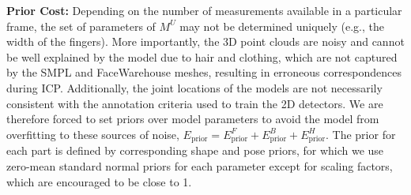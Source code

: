 \textbf{Prior Cost:} 
Depending on the number of measurements available in a particular frame, the set of parameters of $M^U$ may not be determined uniquely (e.g., the width of the fingers). More importantly, the 3D point clouds are noisy and cannot be well explained by the model due to hair and clothing, which are not captured by the SMPL and FaceWarehouse meshes, resulting in erroneous correspondences during ICP. Additionally, the joint locations of the models are not necessarily consistent with the annotation criteria used to train the 2D detectors. We are therefore forced to set priors over model parameters to avoid the model from overfitting to these sources of noise, $E_\textrm{prior} = E^F_\textrm{prior} + E^B_\textrm{prior} + E^H_\textrm{prior}$.
The prior for each part is defined by corresponding shape and pose priors, for which we use zero-mean standard normal priors for each parameter except for scaling factors, which are encouraged to be close to 1. %


